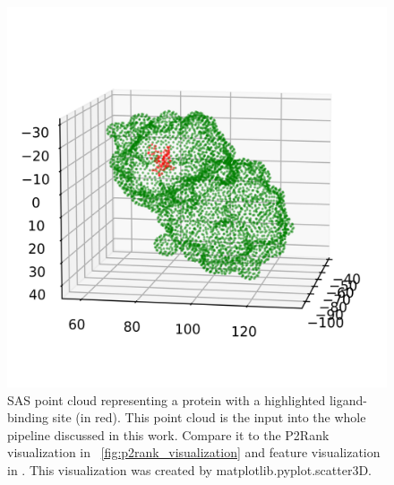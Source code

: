 \begin{figure}
    \centering
    \includegraphics[width=1\linewidth]{point_cloud_class.png}
    \caption{SAS point cloud representing a protein with a highlighted ligand-binding site (in red). This point cloud is the input into the whole pipeline discussed in this work. Compare it to the P2Rank visualization in ~\ref{fig:p2rank_visualization} and feature visualization in 
    \label{fig:class_point_cloud}. This visualization was created by matplotlib.pyplot.scatter3D.}
\end{figure}

